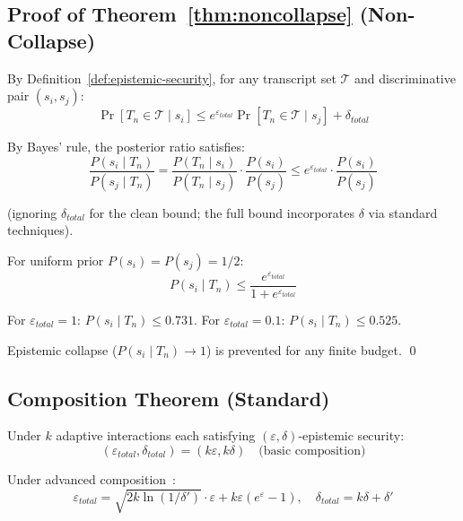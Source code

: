 \documentclass[11pt,a4paper]{article}
\begin{document}
\subsection{Proof of Theorem~\ref{thm:noncollapse} (Non-Collapse)}

By Definition~\ref{def:epistemic-security}, for any transcript set $\mathcal{T}$ and discriminative pair $(s_i, s_j)$:
\begin{equation}
\Pr[T_n \in \mathcal{T} \mid s_i] \le e^{\varepsilon_{total}} \Pr[T_n \in \mathcal{T} \mid s_j] + \delta_{total}
\end{equation}

By Bayes' rule, the posterior ratio satisfies:
\begin{equation}
\frac{P(s_i \mid T_n)}{P(s_j \mid T_n)} = \frac{P(T_n \mid s_i)}{P(T_n \mid s_j)} \cdot \frac{P(s_i)}{P(s_j)} \le e^{\varepsilon_{total}} \cdot \frac{P(s_i)}{P(s_j)}
\end{equation}

(ignoring $\delta_{total}$ for the clean bound; the full bound incorporates $\delta$ via standard techniques).

For uniform prior $P(s_i) = P(s_j) = 1/2$:
\begin{equation}
P(s_i \mid T_n) \le \frac{e^{\varepsilon_{total}}}{1 + e^{\varepsilon_{total}}}
\end{equation}

For $\varepsilon_{total} = 1$: $P(s_i \mid T_n) \le 0.731$. For $\varepsilon_{total} = 0.1$: $P(s_i \mid T_n) \le 0.525$.

Epistemic collapse ($P(s_i \mid T_n) \to 1$) is prevented for any finite budget. \qed

\subsection{Composition Theorem (Standard)}

Under $k$ adaptive interactions each satisfying $(\varepsilon, \delta)$-epistemic security:
\begin{equation}
(\varepsilon_{total}, \delta_{total}) = (k\varepsilon, k\delta) \quad \text{(basic composition)}
\end{equation}

Under advanced composition~\cite{dwork2010boosting}:
\begin{equation}
\varepsilon_{total} = \sqrt{2k \ln(1/\delta')} \cdot \varepsilon + k\varepsilon(e^\varepsilon - 1), \quad \delta_{total} = k\delta + \delta'
\end{equation}
\end{document}

